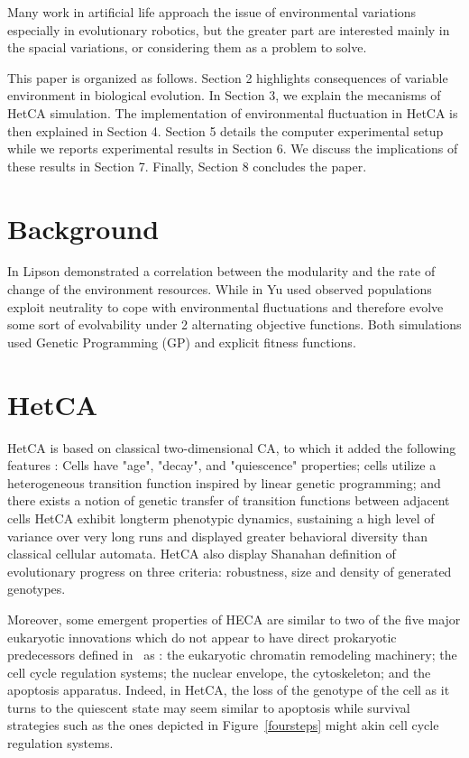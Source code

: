 \documentclass[letterpaper]{article}
\begin{document}
Many work in artificial life approach the issue of environmental variations especially in evolutionary robotics\cite{floreano2000evolutionary}, but the greater part are interested mainly in the spacial variations, or considering them as a problem to solve.

This paper is organized as follows. Section 2 highlights consequences of variable environment in biological evolution. In Section 3, we explain the mecanisms of HetCA simulation. The implementation of environmental fluctuation in HetCA  is then explained in Section 4. Section 5 details the computer experimental setup while we reports experimental results in Section 6. We discuss the implications of these results in Section 7. Finally, Section 8 concludes the paper.


\section{Background}
In \cite{lipson2002origin} Lipson demonstrated a correlation between the modularity and the rate of change of the environment resources. While in \cite{yu2007program} Yu used  observed populations exploit neutrality to cope with environmental fluctuations and therefore evolve some sort of evolvability under 2 alternating objective functions. Both simulations used Genetic Programming (GP) and explicit fitness functions.

\section{HetCA}
HetCA is based on classical two-dimensional CA, to which it added the following features : Cells have "age", "decay", and "quiescence" properties; cells utilize a heterogeneous transition function inspired by linear genetic programming; and there exists a notion of genetic transfer of transition functions between adjacent cells
HetCA exhibit longterm phenotypic dynamics, sustaining a high level of variance
over very long runs and displayed greater behavioral diversity than classical cellular automata\cite{medernach2013long}. HetCA also display Shanahan \cite{shanahan2012evolutionary} definition of evolutionary progress on three criteria: robustness, size and density of generated genotypes\cite{medernach2015evolutionary}.

Moreover, some emergent properties of HECA are similar to two of the five major eukaryotic innovations which do not appear to
have direct prokaryotic predecessors defined in~\cite{smith1997major} as : the eukaryotic chromatin remodeling machinery; the cell cycle regulation
systems; the nuclear envelope, the cytoskeleton; and the apoptosis apparatus\cite{koonin2002origin}. Indeed, in HetCA, the loss of the genotype of the cell as it turns to the quiescent state may seem similar to apoptosis while survival strategies such as the ones depicted in Figure~\ref{foursteps} might akin cell cycle regulation systems. 
\end{document}
